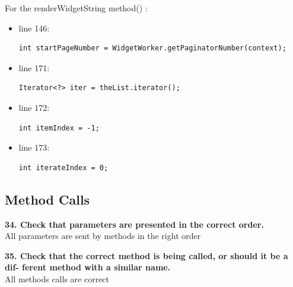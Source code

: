 \documentclass{article}
\begin{document}
\begin{flushleft}
For the renderWidgetString method() :\\
\vspace{0.5cm}
\begin{itemize}
\item line 146:  \\
\vspace{0.5cm}
\begin{lstlisting}
int startPageNumber = WidgetWorker.getPaginatorNumber(context); 
\end{lstlisting}
\vspace{0.5cm}
\item line 171: \\
\vspace{0.5cm}
\begin{lstlisting}
Iterator<?> iter = theList.iterator();
\end{lstlisting}
\vspace{0.5cm}
\item line 172: \\
\vspace{0.5cm}
\begin{lstlisting}
int itemIndex = -1;
\end{lstlisting}
\vspace{0.5cm}
\item line 173: \\
\vspace{0.5cm}
\begin{lstlisting}
int iterateIndex = 0;
\end{lstlisting}
\end{itemize}
\vspace{0.5cm}






\subsection{Method Calls}
\textbf{34. Check that parameters are presented in the correct order.}\\
\vspace{0.5cm}
All parameters are sent by methods in the right order\\
\vspace{0.5cm}


\textbf{35. Check that the correct method is being called, or should it be a dif- ferent method with a similar name.}\\
\vspace{0.5cm}
All methods calls are correct\\
\vspace{0.5cm}


\end{flushleft}
\end{document}
